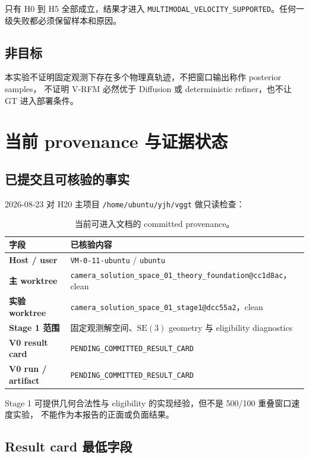 \documentclass[UTF8,a4paper,11pt]{ctexart}
\newcommand{\SE}{\mathrm{SE}}
\begin{document}
只有 H0 到 H5 全部成立，结果才进入
\texttt{MULTIMODAL\_VELOCITY\_SUPPORTED}。任何一级失败都必须保留样本和原因。

\subsection{非目标}

本实验不证明固定观测下存在多个物理真轨迹，不把窗口输出称作 posterior samples，
不证明 V-RFM 必然优于 Diffusion 或 deterministic refiner，也不让 GT 进入部署条件。

\section{当前 provenance 与证据状态}

\subsection{已提交且可核验的事实}

2026-08-23 对 H20 主项目 \texttt{/home/ubuntu/yjh/vggt} 做只读检查：

\begin{table}[htbp]
  \centering
  \small
  \begin{tabularx}{\textwidth}{>{\bfseries}p{3.2cm}X}
    \toprule
    字段 & 已核验内容 \\
    \midrule
    Host / user & \texttt{VM-0-11-ubuntu} / \texttt{ubuntu} \\
    主 worktree & \texttt{camera\_solution\_space\_01\_theory\_foundation@cc1d8ac}，clean \\
    实验 worktree & \texttt{camera\_solution\_space\_01\_stage1@dcc55a2}，clean \\
    Stage 1 范围 & 固定观测解空间、$\SE(3)$ geometry 与 eligibility diagnostics \\
    V0 result card & \texttt{PENDING\_COMMITTED\_RESULT\_CARD} \\
    V0 run / artifact & \texttt{PENDING\_COMMITTED\_RESULT\_CARD} \\
    \bottomrule
  \end{tabularx}
  \caption{当前可进入文档的 committed provenance。}
\end{table}

Stage 1 可提供几何合法性与 eligibility 的实现经验，但不是 500/100 重叠窗口速度实验，
不能作为本报告的正面或负面结果。

\subsection{Result card 最低字段}
\end{document}
